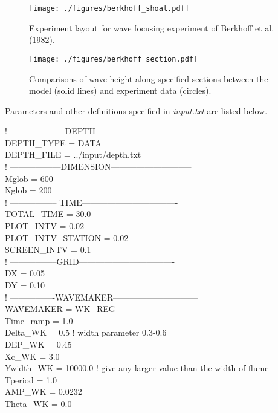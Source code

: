 \documentclass[11pt]{article}
\begin{document}
\begin{figure}[htbp]
\centering
\texttt{[image: ./figures/berkhoff\_shoal.pdf]}
\caption{Experiment layout for wave focusing experiment of Berkhoff et al. (1982).}
\label{berkhoff_depth}
\end{figure}

\begin{figure}[htbp]
\centering
\texttt{[image: ./figures/berkhoff\_section.pdf]}
\caption{Comparisons of wave height along specified sections between the model (solid lines) and experiment data (circles).}
\label{berkhoff_section}
\end{figure}

Parameters and other definitions specified in {\em input.txt} are listed below.

\vspace*{0.5cm}

  ! --------------------DEPTH------------------------------------- \\
DEPTH\_TYPE = DATA\\
DEPTH\_FILE = ../input/depth.txt\\

  ! ------------------DIMENSION-----------------------------\\
Mglob = 600\\
Nglob = 200\\

  ! ----------------- TIME----------------------------------\\
TOTAL\_TIME = 30.0\\
PLOT\_INTV = 0.02\\
PLOT\_INTV\_STATION = 0.02\\
SCREEN\_INTV = 0.1\\

  ! -----------------GRID----------------------------------\\
DX = 0.05\\
DY = 0.10\\

  ! ----------------WAVEMAKER------------------------------\\
WAVEMAKER = WK\_REG\\
Time\_ramp = 1.0 \\
Delta\_WK = 0.5    ! width parameter 0.3-0.6\\
DEP\_WK = 0.45\\
Xc\_WK = 3.0\\
Ywidth\_WK = 10000.0  ! give any larger value than the width of flume\\
Tperiod = 1.0\\
AMP\_WK = 0.0232\\
Theta\_WK = 0.0\\
\end{document}
